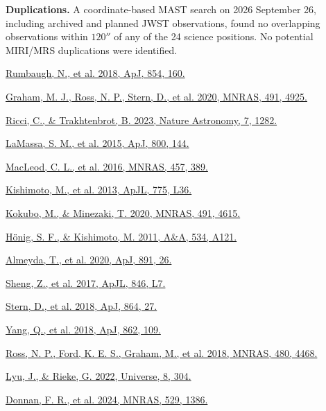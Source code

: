 \documentclass[12pt]{article}
\begin{document}
\noindent\textbf{Duplications.} A coordinate-based MAST search on 2026 September 26, including archived and planned JWST observations, found no overlapping observations within $120''$ of any of the 24 science positions. No potential MIRI/MRS duplications were identified.

\noindent [1] \href{https://doi.org/10.3847/1538-4357/aaa9b6}{Rumbaugh, N., et al. 2018, ApJ, 854, 160.}\par
\noindent [2] \href{https://doi.org/10.1093/mnras/stz3244}{Graham, M. J., Ross, N. P., Stern, D., et al. 2020, MNRAS, 491, 4925.}\par
\noindent [3] \href{https://www.nature.com/articles/s41550-023-02108-4}{Ricci, C., \& Trakhtenbrot, B. 2023, Nature Astronomy, 7, 1282.}\par
\noindent [4] \href{https://doi.org/10.1088/0004-637X/800/2/144}{LaMassa, S. M., et al. 2015, ApJ, 800, 144.}\par
\noindent [5] \href{https://doi.org/10.1093/mnras/stv2997}{MacLeod, C. L., et al. 2016, MNRAS, 457, 389.}\par
\noindent [6] \href{https://arxiv.org/abs/1308.6517}{Kishimoto, M., et al. 2013, ApJL, 775, L36.}\par
\noindent [7] \href{https://academic.oup.com/mnras/article/491/4/4615/5652205}{Kokubo, M., \& Minezaki, T. 2020, MNRAS, 491, 4615.}\par
\noindent [8] \href{https://doi.org/10.1051/0004-6361/201117750}{H\"onig, S. F., \& Kishimoto, M. 2011, A\&A, 534, A121.}\par
\noindent [9] \href{https://doi.org/10.3847/1538-4357/ab6aa1}{Almeyda, T., et al. 2020, ApJ, 891, 26.}\par
\noindent [10] \href{https://authors.library.caltech.edu/records/qjtjh-0cw44}{Sheng, Z., et al. 2017, ApJL, 846, L7.}\par
\noindent [11] \href{https://authors.library.caltech.edu/records/azy2b-r2w44}{Stern, D., et al. 2018, ApJ, 864, 27.}\par
\noindent [12] \href{https://arxiv.org/abs/1711.08122}{Yang, Q., et al. 2018, ApJ, 862, 109.}\par
\noindent [13] \href{https://doi.org/10.1093/mnras/sty2002}{Ross, N. P., Ford, K. E. S., Graham, M., et al. 2018, MNRAS, 480, 4468.}\par
\noindent [14] \href{https://doi.org/10.3390/universe8060304}{Lyu, J., \& Rieke, G. 2022, Universe, 8, 304.}\par
\noindent [15] \href{https://doi.org/10.1093/mnras/stae612}{Donnan, F. R., et al. 2024, MNRAS, 529, 1386.}\par
\end{document}
